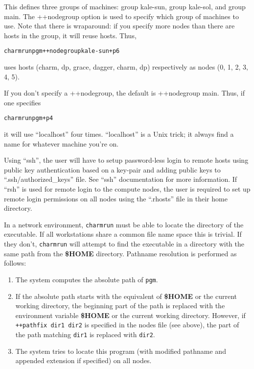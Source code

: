 This defines three groups of machines: group kale-sun, group kale-sol,
and group main.  The ++nodegroup option is used to specify which group
of machines to use.  Note that there is wraparound: if you specify
more nodes than there are hosts in the group, it will reuse
hosts. Thus,

\begin{alltt}
        charmrun pgm ++nodegroup kale-sun +p6
\end{alltt}

uses hosts (charm, dp, grace, dagger, charm, dp) respectively as
nodes (0, 1, 2, 3, 4, 5).

If you don't specify a ++nodegroup, the default is ++nodegroup main.
Thus, if one specifies

\begin{alltt}
        charmrun pgm +p4
\end{alltt}

it will use ``localhost'' four times.  ``localhost'' is a Unix
trick; it always find a name for whatever machine you're on.

Using ``ssh'', the user will have to setup
password-less login to remote hosts using
public key authentication based on a key-pair and adding public keys to
``.ssh/authorized\_keys'' file. See ``ssh'' documentation for more information.
If ``rsh'' is used for remote
login to the compute nodes, the user is required to set up remote login permissions on all nodes
using the ``.rhosts'' file in their home directory.

In a network environment, {\tt charmrun} must
be able to locate the directory of the executable.  If all workstations
share a common file name space this is trivial.  If they don't, {\tt charmrun}
will attempt to find the executable in a directory with the same path
from the {\bf \$HOME} directory.  Pathname resolution is performed as
follows:
\begin{enumerate}
	\item The system computes the absolute path of {\tt pgm}.
	\item If the absolute path starts with the equivalent of {\bf \$HOME}
	or the current working directory, the beginning part of the
        path
	is replaced with the environment variable {\bf \$HOME} or the
	current working directory. However, if {\tt ++pathfix dir1 dir2} is
        specified in the nodes file (see above), the part of
        the path matching {\tt dir1} is replaced with {\tt dir2}.
	\item The system tries to locate this program (with modified
	pathname and appended extension if specified) on all nodes.
\end{enumerate}


